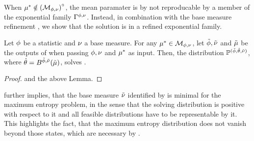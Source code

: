 When $\mu^*\notin{\left(\mathcal{M}_{\phi,\nu}\right)}^{\circ}$, the mean paramater is by  not reproducable by a member of the exponential family $\Gamma^{\phi,\nu}$. 
Instead, in combination with the base measure refinement , we show that the solution is in a refined exponential family.

\begin{theorem}\label{the:maxEntMaxLikeDuality} 
	Let $\phi$ be a statistic and $\nu$ a base measure.
	For any $\mu^*\in\mathcal{M}_{\phi,\nu}$, let $\tilde{\phi},\tilde{\nu}$ and $\tilde{\mu}$ be the outputs of  when passing $\phi,\nu$ and $\mu^*$ as input.
	Then, the distribution $\mathbb{P}^{(\tilde{\phi},\hat{\theta},\tilde{\nu})}$, where $\hat{\theta}=B^{\tilde{\phi},\tilde{\nu}}(\tilde{\mu})$, solves .
\end{theorem}
\begin{proof}
	 and the above Lemma.
\end{proof}

 further implies, that the base measure $\tilde{\nu}$ identified by  is minimal for the maximum entropy problem, in the sense that the solving distribution is positive with respect to it and all feasible distributions have to be representable by it.
This highlights the fact, that the maximum entropy distribution does not vanish beyond those states, which are necessary by .


